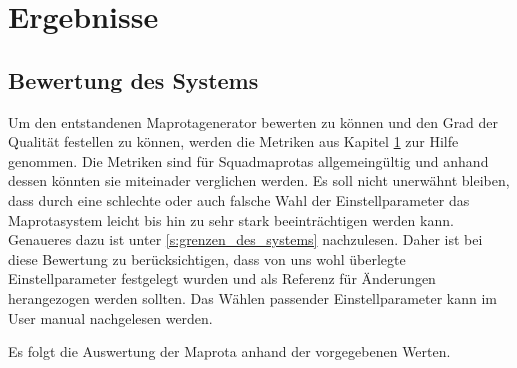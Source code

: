 \section{Ergebnisse}
    
    \subsection{Bewertung des Systems}
        \label{sec:bewerten_des_systems}
        Um den entstandenen Maprotagenerator bewerten zu können und den Grad der Qualität festellen zu können, 
        werden die Metriken aus Kapitel \ref{}  zur Hilfe genommen. Die Metriken sind für Squadmaprotas
        allgemeingültig und anhand dessen könnten sie miteinader verglichen werden. Es soll nicht unerwähnt bleiben,
        dass durch eine schlechte oder auch falsche Wahl der Einstellparameter das Maprotasystem leicht bis hin zu 
        sehr stark beeinträchtigen werden kann. Genaueres dazu ist unter \ref{s:grenzen_des_systems} nachzulesen.
        Daher ist bei diese Bewertung zu berücksichtigen, dass von uns wohl überlegte Einstellparameter festgelegt wurden
        und als Referenz für Änderungen herangezogen werden sollten.
        Das Wählen passender Einstellparameter kann im User manual nachgelesen werden.
   
        Es folgt die Auswertung der Maprota anhand der vorgegebenen Werten.\\

